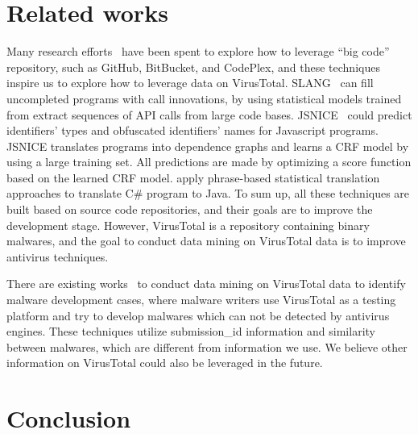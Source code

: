 \section{Related works}

Many research efforts~\cite{bigcode, big-lessons,big-translation,code-completion,big-predicting} 
have been spent to explore how to leverage ``big code'' repository, 
such as GitHub, BitBucket, and CodePlex, and these techniques inspire us to explore how to leverage data on VirusTotal. 
SLANG~\cite{code-completion} can fill uncompleted programs with call innovations, 
by using statistical models trained from extract sequences of API calls from large code bases.  
JSNICE~\cite{big-predicting} could predict identifiers' types and obfuscated identifiers' names for Javascript programs. 
JSNICE translates programs into dependence graphs and learns a CRF model by using a large training set. 
All predictions are made by optimizing a score function based on the learned CRF model. 
\citet{big-translation} apply phrase-based statistical translation approaches to translate C\# program to Java.
To sum up, all these techniques are built based on source code repositories, 
and their goals are to improve the development stage. 
However, VirusTotal is a repository containing binary malwares, 
and the goal to conduct data mining on VirusTotal data is to improve antivirus techniques. 

There are existing works~\cite{hacker-vt,neeles} to conduct data mining on VirusTotal data to identify malware development cases, 
where malware writers use VirusTotal as a testing platform and 
try to develop malwares which can not be detected by antivirus engines. 
These techniques utilize submission\_id information and similarity between malwares, which are different from information we use. 
We believe other information on VirusTotal could also be leveraged in the future. 

\section{Conclusion}

